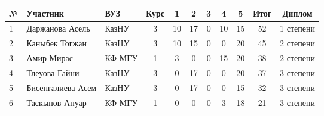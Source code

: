 \begin{center}
\begin{tabular}{|l|l|l|c|c|c|c|c|c|c|c|}
\hline
№ & Участник & ВУЗ & Курс & 1 & 2 & 3 & 4 & 5  & Итог & Диплом \\
\hline
1 & Даржанова Асель & КазНУ & 3 & 10 & 17 & 0 & 10 & 15 & 52 & 1 степени \\
\hline
2 & Каныбек Тогжан & КазНУ & 3 & 10 & 15 & 0 & 0 & 20 & 45 & 2 степени \\
\hline
3 & Амир Мирас & КФ МГУ & 1 & 3 & 0 & 0 & 15 & 20 & 38 & 2 степени \\
\hline
4 & Тлеуова Гайни & КазНУ & 3 & 0 & 17 & 0 & 0 & 20 & 37 & 3 степени \\
\hline
5 & Бисенгалиева Асем & КазНУ & 3 & 0 & 17 & 0 & 0 & 15 & 32 & 3 степени \\
\hline
6 & Таскынов Ануар & КФ МГУ & 1 & 0 & 0 & 0 & 3 & 18 & 21 & 3 степени \\
\hline
\end{tabular}
\end{center}
